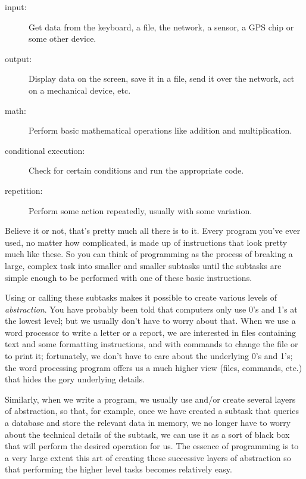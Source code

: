 \begin{description}

\item[input:] Get data from the keyboard, a file, the network, 
a sensor, a GPS chip or some other device.

\item[output:] Display data on the screen, save it in a
file, send it over the network, act on a mechanical device,  etc.

\item[math:] Perform basic mathematical operations like addition and
multiplication.

\item[conditional execution:] Check for certain conditions and
run the appropriate code.

\item[repetition:] Perform some action repeatedly, usually with
some variation.

\end{description}

Believe it or not, that's pretty much all there is to it.  Every
program you've ever used, no matter how complicated, is made up of
instructions that look pretty much like these.  So you can think of
programming as the process of breaking a large, complex task
into smaller and smaller subtasks until the subtasks are
simple enough to be performed with one of these basic instructions. 

Using or calling these subtasks makes it possible to create 
various levels of \emph{abstraction}. You have probably 
been told that computers only use 0's and 1's at the 
lowest level; but we usually don't have to worry about that. 
When we use a word processor to write a letter or a report, 
we are interested in files containing text and some 
formatting instructions, and with commands to change the 
file or to print it; fortunately, we don't have to 
care about the underlying 0's and 1's; the word 
processing program offers us a much higher view (files, 
commands, etc.) that hides the gory underlying details.

Similarly, when we write a program, 
we usually use and/or create several layers of abstraction, 
so that, for example, once we have created a subtask that 
queries a database and store the relevant data in 
memory, we no longer have to worry about the technical 
details of the subtask, we can use it as a sort of black 
box that will perform the desired operation for us. 
The essence of programming is to a very large extent this 
art of creating these successive layers of abstraction 
so that performing the higher level tasks becomes 
relatively easy.


